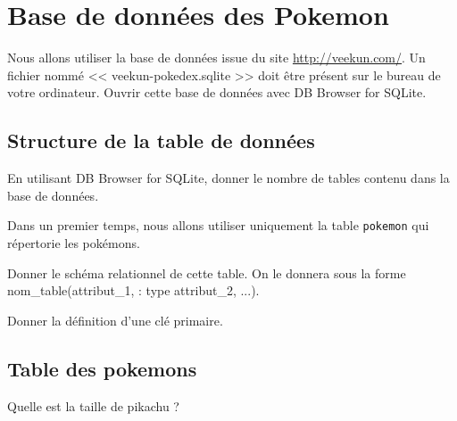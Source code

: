 
\section*{Base de données des Pokemon}
\label{sec:bdd}

Nous allons utiliser la base de données issue du site \url{http://veekun.com/}. Un fichier nommé << veekun-pokedex.sqlite >> doit être présent sur le bureau de votre ordinateur. Ouvrir cette base de données avec DB Browser for SQLite.


%

\subsection*{Structure de la table de données}

\question{}
En utilisant DB Browser for SQLite, donner le nombre de tables contenu dans la base de données. 


Dans un premier temps, nous allons utiliser uniquement la table \texttt{pokemon} qui répertorie les pokémons.

\question{}
Donner le schéma relationnel de cette table. On le donnera sous la forme nom\_table(attribut\_1, : type attribut\_2, ...).

\question{}
Donner la définition d'une clé primaire.

\subsection*{Table des pokemons}



\question{}
Quelle est la taille de pikachu ?

